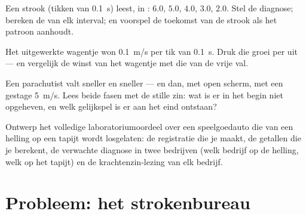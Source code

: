 \begin{exercise}[$\star\star$]\label{exo:g9:uniform-varied-motion:9}
Een strook (tikken van \qty{0.1}{s}) leest, in
: $6.0$, $5.0$, $4.0$, $3.0$, $2.0$. Stel de diagnose;
bereken de  van elk interval; en voorspel de toekomst
van de strook als het patroon aanhoudt.
\end{exercise}

\begin{exercise}[$\star\star$]\label{exo:g9:uniform-varied-motion:10}
Het uitgewerkte wagentje won \qty{0.1}{m/s} per tik van \qty{0.1}{s}.
Druk die groei per \emph{} uit --- en vergelijk de winst van het
wagentje met die van de vrije val.
\end{exercise}

\begin{exercise}[$\star\star$]\label{exo:g9:uniform-varied-motion:11}
Een parachutist valt sneller en sneller --- en dan, met open scherm,
met een gestage \qty{5}{m/s}. Lees beide
fasen met de stille zin: wat is er in het begin niet opgeheven,
en welk gelijkspel is er aan het eind ontstaan?
\end{exercise}

\begin{exercise}[$\star\star\star$]\label{exo:g9:uniform-varied-motion:12}
Ontwerp het volledige laboratoriumoordeel over een speelgoedauto die
van een helling op een tapijt wordt losgelaten: de registratie die je
maakt, de getallen die je berekent, de verwachte diagnose in twee
bedrijven (welk bedrijf op de helling, welk op het tapijt) en de
krachtenzin-lezing van elk bedrijf.
\end{exercise}

\section{Probleem: het strokenbureau}

